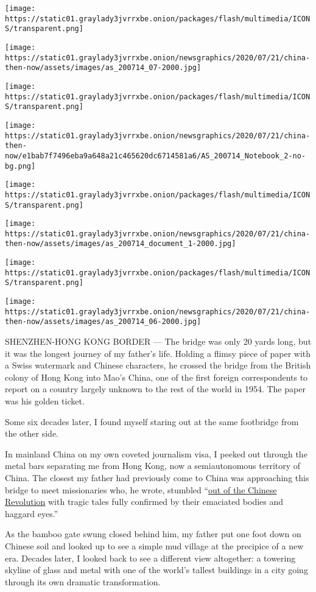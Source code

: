 \texttt{[image: https://static01.graylady3jvrrxbe.onion/packages/flash/multimedia/ICONS/transparent.png]}

\texttt{[image: https://static01.graylady3jvrrxbe.onion/newsgraphics/2020/07/21/china-then-now/assets/images/as\_200714\_07-2000.jpg]}

\texttt{[image: https://static01.graylady3jvrrxbe.onion/packages/flash/multimedia/ICONS/transparent.png]}

\texttt{[image: https://static01.graylady3jvrrxbe.onion/newsgraphics/2020/07/21/china-then-now/e1bab7f7496eba9a648a21c465620dc6714581a6/AS\_200714\_Notebook\_2-no-bg.png]}

\texttt{[image: https://static01.graylady3jvrrxbe.onion/packages/flash/multimedia/ICONS/transparent.png]}

\texttt{[image: https://static01.graylady3jvrrxbe.onion/newsgraphics/2020/07/21/china-then-now/assets/images/as\_200714\_document\_1-2000.jpg]}

\texttt{[image: https://static01.graylady3jvrrxbe.onion/packages/flash/multimedia/ICONS/transparent.png]}

\texttt{[image: https://static01.graylady3jvrrxbe.onion/newsgraphics/2020/07/21/china-then-now/assets/images/as\_200714\_06-2000.jpg]}

SHENZHEN-HONG KONG BORDER --- The bridge was only 20 yards long, but it
was the longest journey of my father's life. Holding a flimsy piece of
paper with a Swiss watermark and Chinese characters, he crossed the
bridge from the British colony of Hong Kong into Mao's China, one of the
first foreign correspondents to report on a country largely unknown to
the rest of the world in 1954. The paper was his golden ticket.

Some six decades later, I found myself staring out at the same
footbridge from the other side.

In mainland China on my own coveted journalism visa, I peeked out
through the metal bars separating me from Hong Kong, now a
semiautonomous territory of China. The closest my father had previously
come to China was approaching this bridge to meet missionaries who, he
wrote, stumbled
``\href{https://archive.nytimes3xbfgragh.onion/www.nytimes3xbfgragh.onion/library/world/asia/china-index-timeline.html}{out
of the Chinese Revolution} with tragic tales fully confirmed by their
emaciated bodies and haggard eyes.''

As the bamboo gate swung closed behind him, my father put one foot down
on Chinese soil and looked up to see a simple mud village at the
precipice of a new era. Decades later, I looked back to see a different
view altogether: a towering skyline of glass and metal with one of the
world's tallest buildings in a city going through its own dramatic
transformation.

